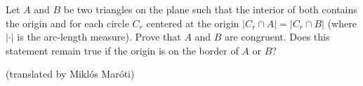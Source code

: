 Let $A$ and $B$ be two triangles on the plane such that the interior of both contains the origin and for each circle $C_r$ centered at the origin $|C_r \cap A|=|C_r\cap B|$ (where $|\cdot |$ is the arc-length measure). Prove that $A$ and $B$ are congruent. Does this statement remain true if the origin is on the border of $A$ or $B$?

(translated by Miklós Maróti)